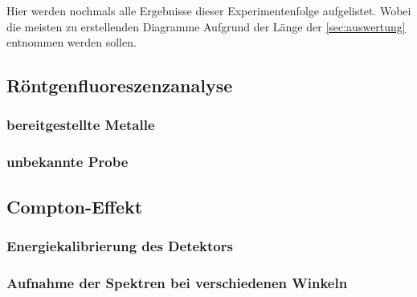 \documentclass[12pt,english,ngerman]{scrartcl}
\begin{document}
Hier werden nochmals alle Ergebnisse dieser Experimentenfolge aufgelistet.
Wobei die meisten zu erstellenden Diagramme Aufgrund der Länge der
\autoref{sec:auswertung} entnommen werden sollen.

\subsection{Röntgenfluoreszenzanalyse}

\subsubsection{bereitgestellte Metalle}

\subsubsection{unbekannte Probe}

\subsection{Compton-Effekt}

\subsubsection{Energiekalibrierung des Detektors}

\subsubsection{Aufnahme der Spektren bei verschiedenen Winkeln}

\newpage
\printbibliography
\listoffigures
\listoftables
\end{document}
